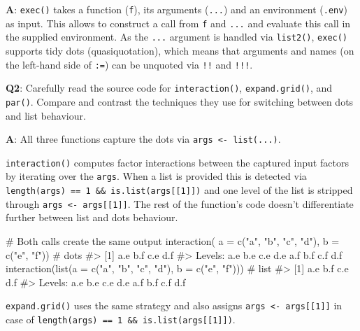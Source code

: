 \documentclass[
]{krantz}
\makeatletter
\newenvironment{Shaded}{\begin{snugshade}}{\end{snugshade}}
\newcommand{\CommentTok}[1]{\textcolor[rgb]{0.56,0.35,0.01}{\textit{#1}}}
\newcommand{\DataTypeTok}[1]{\textcolor[rgb]{0.13,0.29,0.53}{#1}}
\newcommand{\KeywordTok}[1]{\textcolor[rgb]{0.13,0.29,0.53}{\textbf{#1}}}
\newcommand{\NormalTok}[1]{#1}
\newcommand{\StringTok}[1]{\textcolor[rgb]{0.31,0.60,0.02}{#1}}
\newenvironment{kframe}{%
\medskip{}
\setlength{\fboxsep}{.8em}
 \def\at@end@of@kframe{}%
 \ifinner\ifhmode%
  \def\at@end@of@kframe{\end{minipage}}%
  \begin{minipage}{\columnwidth}%
 \fi\fi%
 \def\FrameCommand##1{\hskip\@totalleftmargin \hskip-\fboxsep
 \colorbox{shadecolor}{##1}\hskip-\fboxsep
     \hskip-\linewidth \hskip-\@totalleftmargin \hskip\columnwidth}%
 \MakeFramed {\advance\hsize-\width
   \@totalleftmargin\z@ \linewidth\hsize
   \@setminipage}}%
 {\par\unskip\endMakeFramed%
 \at@end@of@kframe}
\renewenvironment{Shaded}{\begin{kframe}}{\end{kframe}}
\renewcommand{\KeywordTok} [1]{\textcolor[rgb]{0.00,0.44,0.13}{{#1}}}
\renewcommand{\DataTypeTok}[1]{\textcolor[rgb]{0.56,0.13,0.00}{{#1}}}
\renewcommand{\StringTok}  [1]{\textcolor[rgb]{0.25,0.44,0.63}{{#1}}}
\renewcommand{\CommentTok} [1]{\textcolor[rgb]{0.38,0.63,0.69}{{#1}}}
\renewcommand{\NormalTok}  [1]{{#1}}
\makeatother
\begin{document}
\textbf{{A}}: \texttt{exec()} takes a function (\texttt{f}), its arguments (\texttt{...}) and an environment (\texttt{.env}) as input. This allows to construct a call from \texttt{f} and \texttt{...} and evaluate this call in the supplied environment. As the \texttt{...} argument is handled via \texttt{list2()}, \texttt{exec()} supports tidy dots (quasiquotation), which means that arguments and names (on the left-hand side of \texttt{:=}) can be unquoted via \texttt{!!} and \texttt{!!!}.

\textbf{{Q2}}: Carefully read the source code for \texttt{interaction()}, \texttt{expand.grid()}, and \texttt{par()}. Compare and contrast the techniques they use for switching between dots and list behaviour.

\textbf{{A}}: All three functions capture the dots via \texttt{args\ \textless{}-\ list(...)}.

\texttt{interaction()} computes factor interactions between the captured input factors by iterating over the \texttt{args}. When a list is provided this is detected via \texttt{length(args)\ ==\ 1\ \&\&\ is.list(args{[}{[}1{]}{]})} and one level of the list is stripped through \texttt{args\ \textless{}-\ args{[}{[}1{]}{]}}. The rest of the function's code doesn't differentiate further between list and dots behaviour.

\begin{Shaded}
\begin{Highlighting}[]
\CommentTok{# Both calls create the same output}
\KeywordTok{interaction}\NormalTok{(     }\DataTypeTok{a =} \KeywordTok{c}\NormalTok{(}\StringTok{"a"}\NormalTok{, }\StringTok{"b"}\NormalTok{, }\StringTok{"c"}\NormalTok{, }\StringTok{"d"}\NormalTok{), }\DataTypeTok{b =} \KeywordTok{c}\NormalTok{(}\StringTok{"e"}\NormalTok{, }\StringTok{"f"}\NormalTok{))   }\CommentTok{# dots}
\CommentTok{#> [1] a.e b.f c.e d.f}
\CommentTok{#> Levels: a.e b.e c.e d.e a.f b.f c.f d.f}
\KeywordTok{interaction}\NormalTok{(}\KeywordTok{list}\NormalTok{(}\DataTypeTok{a =} \KeywordTok{c}\NormalTok{(}\StringTok{"a"}\NormalTok{, }\StringTok{"b"}\NormalTok{, }\StringTok{"c"}\NormalTok{, }\StringTok{"d"}\NormalTok{), }\DataTypeTok{b =} \KeywordTok{c}\NormalTok{(}\StringTok{"e"}\NormalTok{, }\StringTok{"f"}\NormalTok{)))  }\CommentTok{# list}
\CommentTok{#> [1] a.e b.f c.e d.f}
\CommentTok{#> Levels: a.e b.e c.e d.e a.f b.f c.f d.f}
\end{Highlighting}
\end{Shaded}

\texttt{expand.grid()} uses the same strategy and also assigns \texttt{args\ \textless{}-\ args{[}{[}1{]}{]}} in case of \texttt{length(args)\ ==\ 1\ \&\&\ is.list(args{[}{[}1{]}{]})}.
\end{document}
